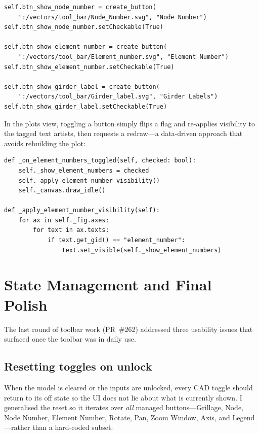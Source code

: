 \begin{lstlisting}[caption={Creating the checkable label-toggle buttons (\texttt{custom\_widgets.py}).},label={lst:tbtoggles}]
self.btn_show_node_number = create_button(
    ":/vectors/tool_bar/Node_Number.svg", "Node Number")
self.btn_show_node_number.setCheckable(True)

self.btn_show_element_number = create_button(
    ":/vectors/tool_bar/Element_number.svg", "Element Number")
self.btn_show_element_number.setCheckable(True)

self.btn_show_girder_label = create_button(
    ":/vectors/tool_bar/Girder_label.svg", "Girder Labels")
self.btn_show_girder_label.setCheckable(True)
\end{lstlisting}

In the plots view, toggling a button simply flips a flag and re-applies visibility to the
tagged text artists, then requests a redraw---a data-driven approach that avoids rebuilding the
plot:

\begin{lstlisting}[caption={Applying element-number visibility to Matplotlib artists (\texttt{mpl\_plot\_widget.py}).},label={lst:mplvis}]
def _on_element_numbers_toggled(self, checked: bool):
    self._show_element_numbers = checked
    self._apply_element_number_visibility()
    self._canvas.draw_idle()

def _apply_element_number_visibility(self):
    for ax in self._fig.axes:
        for text in ax.texts:
            if text.get_gid() == "element_number":
                text.set_visible(self._show_element_numbers)
\end{lstlisting}

\section{State Management and Final Polish}
The last round of toolbar work (PR~\#262) addressed three usability issues that surfaced once
the toolbar was in daily use.

\subsection{Resetting toggles on unlock}
When the model is cleared or the inputs are unlocked, every CAD toggle should return to its
off state so the UI does not lie about what is currently shown. I generalised the reset so it
iterates over \emph{all} managed buttons---Grillage, Node, Node Number, Element Number, Rotate,
Pan, Zoom Window, Axis, and Legend---rather than a hard-coded subset:

